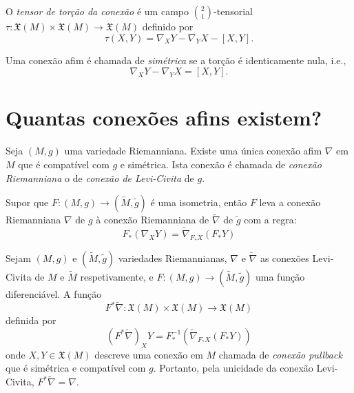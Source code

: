 \begin{definicao}
	O \emph{tensor de torção da conexão} é um campo $ \binom{2}{1} $-tensorial $\tau: \mathfrak{X}(M) \times \mathfrak{X}(M) \rightarrow \mathfrak{X}(M)$ definido por
	\begin{equation*}
		\tau(X,Y) = \nabla_X Y - \nabla_Y X - [X,Y].
	\end{equation*}
\end{definicao}

\begin{definicao}
	Uma conexão afim é chamada de \emph{simétrica} se a torção é identicamente nula, i.e.,
	\begin{equation*}
		\nabla_X Y - \nabla_Y X = [X,Y].
	\end{equation*}
\end{definicao}

\section{Quantas conexões afins existem?}

\begin{teorema}
	Seja $(M,g)$ uma variedade Riemanniana. Existe uma única conexão afim $\nabla$ em $M$ que é compatível com $g$ e simétrica.
	Ista conexão é chamada de \emph{conexão Riemanniana} o de \emph{conexão de Levi-Civita} de $g$.
\end{teorema}

\begin{proposicao}
	Supor que $F: (M,g) \rightarrow (\tilde{M}, \tilde{g})$ é uma isometria, então $F$ leva a conexão Riemanniana $\nabla$ de $g$ à conexão Riemanniana de $\tilde{\nabla}$ de $\tilde{g}$ com a regra:
	\begin{equation*}
		F_* (\nabla_X Y) = \tilde{\nabla}_{F_* X} (F_* Y)
	\end{equation*}
\end{proposicao}

\begin{observacao}
	Sejam $(M,g)$ e $(\tilde{M}, \tilde{g})$ variedades Riemannianas, $\nabla$ e $\tilde{\nabla}$ as conexões Levi-Civita de $M$ e $\tilde{M}$ respetivamente, e $F: (M,g) \rightarrow (\tilde{M},\tilde{g})$ uma função diferenciável. A função
	\begin{equation*}
		F^* \tilde{\nabla}: \mathfrak{X}(M) \times \mathfrak{X}(M) \rightarrow \mathfrak{X}(M)
	\end{equation*}
	definida por
	\begin{equation*}
		\left( F^* \tilde{\nabla} \right)_X Y = F^{-1}_* \left( \tilde{\nabla}_{F_* X} (F_* Y) \right)
	\end{equation*}
	onde $X,Y \in \mathfrak{X}(M)$ descreve uma conexão em $M$ chamada de \emph{conexão pullback} que é simétrica e compatível com $g$. Portanto, pela unicidade da conexão Levi-Civita, $F^* \tilde{\nabla} = \nabla$.
\end{observacao}

